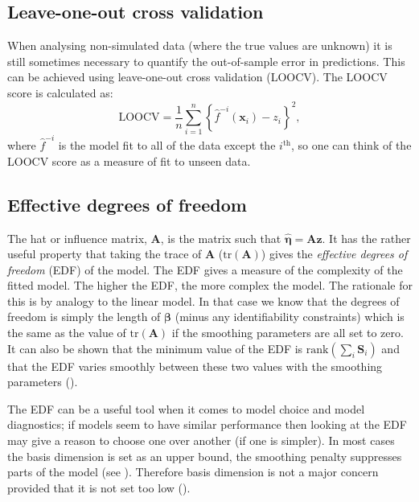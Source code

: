 \subsection{Leave-one-out cross validation}
\label{DEFN-LOOCV}

When analysing non-simulated data (where the true values are unknown) it is still sometimes necessary to quantify the out-of-sample error in predictions. This can be achieved using leave-one-out cross validation (LOOCV). The LOOCV score is calculated as:
\begin{equation}
\text{LOOCV} = \frac{1}{n} \sum_{i=1}^n \left \{ \hat{f}^{-i}(\mathbf{x}_i) - z_i \right\}^2,
\end{equation}
where $\hat{f}^{-i}$ is the model fit to all of the data except the $i^\text{th}$, so one can think of the LOOCV score as a measure of fit to unseen data.

\subsection{Effective degrees of freedom}
\label{GAMEDF}

The hat or influence matrix, $\mathbf{A}$, is the matrix such that $\hat{\bm{\eta}} = \mathbf{A}\mathbf{z}$. It has the rather useful property that taking the trace of $\mathbf{A}$ ($\text{tr}(\mathbf{A})$) gives the \textit{effective degrees of freedom} (EDF) of the model. The EDF gives a measure of the complexity of the fitted model. The higher the EDF, the more complex the model. The rationale for this is by analogy to the linear model. In that case we know that the degrees of freedom is simply the length of $\bm{\beta}$ (minus any identifiability constraints) which is the same as the value of $\text{tr}(\mathbf{A})$ if the smoothing parameters are all set to zero. It can also be shown that the minimum value of the EDF is $\text{rank}(\sum_i \mathbf{S}_i)$ and that the EDF varies smoothly between these two values with the smoothing parameters (\cite[p. 170--171]{simonbook}).

The EDF can be a useful tool when it comes to model choice and model diagnostics; if models seem to have similar performance then looking at the EDF may give a reason to choose one over another (if one is simpler). In most cases the basis dimension is set as an upper bound, the smoothing penalty suppresses parts of the model (see ). Therefore basis dimension is not a major concern provided that it is not set too low (\cite[p. 161]{simonbook}). 

